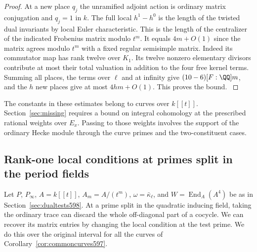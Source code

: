 \documentclass[a4paper,11pt]{article}
\theoremstyle{definition}
\theoremstyle{remark}
\numberwithin{equation}{section}
\begin{document}
\begin{proof}
At a new place \(q_j\) the unramified adjoint action
is ordinary matrix conjugation and \(q_j=1\) in \(k\).
The full local \(h^1-h^0\) is the length of the twisted
dual invariants by local Euler characteristic. This is
the length of the centralizer of the indicated Frobenius
matrix modulo \(t^m\). It equals \(4m+O(1)\) since the
matrix agrees modulo \(t^m\) with a fixed regular
semisimple matrix. Indeed its commutator map has rank
twelve over \(K_1\). Its twelve nonzero elementary
divisors contribute at most their total valuation in
addition to the four free kernel terms. Summing all
places, the terms over \(\ell\) and at infinity give
\((10-6)[F:\QQ]m\), and the \(h\) new places give at
most \(4hm+O(1)\). This proves the bound.
\cite{XII-IX-V-milne98}
\end{proof}

The constants in these estimates belong to curves over
\(k[[t]]\). Section~\ref{sec:missing} requires a bound
on integral cohomology at the prescribed rational
weights over \(E_x\). Passing to those weights involves
the support of the ordinary Hecke module through the
curve primes and the two-constituent cases.


\subsection{Rank-one local conditions at primes split in the period fields}
\label{sec:projectiveprobes599}

Let \(P\), \(P_\infty\), \(A=k[[t]]\), \(A_m=A/(t^m)\),
\(\omega=\bar\kappa_\ell\), and \(W=\operatorname{End}_A(A^4)\)
be as in Section~\ref{sec:dualtests598}. At a prime split
in the quadratic inducing field, taking the ordinary trace
can discard the whole off-diagonal part of a cocycle.
We can recover its matrix entries by changing the local
condition at the test prime. We do this over the original
interval for all the curves of Corollary~\ref{cor:commoncurves597}.
\end{document}
